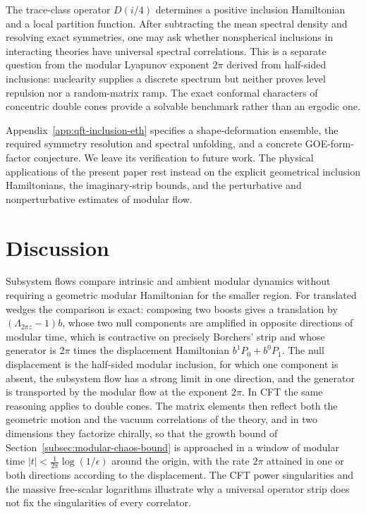 \documentclass[a4paper,11pt]{article}
\theoremstyle{definition}
\begin{document}
The trace-class operator $D(i/4)$ determines a positive inclusion Hamiltonian and a local partition function. After subtracting the mean spectral density and resolving exact symmetries, one may ask whether nonspherical inclusions in interacting theories have universal spectral correlations. This is a separate question from the modular Lyapunov exponent $2\pi$ derived from half-sided inclusions: nuclearity supplies a discrete spectrum but neither proves level repulsion nor a random-matrix ramp. The exact conformal characters of concentric double cones provide a solvable benchmark rather than an ergodic one.

Appendix~\ref{app:qft-inclusion-eth} specifies a shape-deformation ensemble, the required symmetry resolution and spectral unfolding, and a concrete GOE-form-factor conjecture. We leave its verification to future work. The physical applications of the present paper rest instead on the explicit geometrical inclusion Hamiltonians, the imaginary-strip bounds, and the perturbative and nonperturbative estimates of modular flow.

\section{Discussion}\label{sec:discussion}

Subsystem flows compare intrinsic and ambient modular dynamics without requiring a geometric modular Hamiltonian for the smaller region. For translated wedges the comparison is exact: composing two boosts gives a translation by $(\Lambda_{2\pi z}-1)b$, whose two null components are amplified in opposite directions of modular time, which is contractive on precisely Borchers' strip and whose generator is $2\pi$ times the displacement Hamiltonian $b^1P_0+b^0P_1$. The null displacement is the half-sided modular inclusion, for which one component is absent, the subsystem flow has a strong limit in one direction, and the generator is transported by the modular flow at the exponent $2\pi$. In CFT the same reasoning applies to double cones. The matrix elements then reflect both the geometric motion and the vacuum correlations of the theory, and in two dimensions they factorize chirally, so that the growth bound of Section~\ref{subsec:modular-chaos-bound} is approached in a window of modular time $|t|<\tfrac1{2\pi}\log(1/\epsilon)$ around the origin, with the rate $2\pi$ attained in one or both directions according to the displacement. The CFT power singularities and the massive free-scalar logarithms illustrate why a universal operator strip does not fix the singularities of every correlator.
\end{document}
